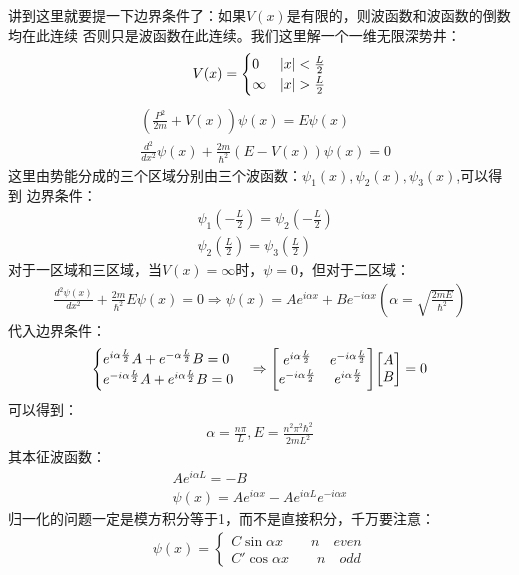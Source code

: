\documentclass[UTF8]{article}
\numberwithin{equation}{section}
\begin{document}
讲到这里就要提一下边界条件了：如果$V(x)$是有限的，则波函数和波函数的倒数均在此连续
否则只是波函数在此连续。我们这里解一个一维无限深势井：
\begin{align*}
    V(x)=\begin{cases}
             0      & \abs{x}<\frac{L}{2} \\
             \infty & \abs{x}>\frac{L}{2}
         \end{cases}
\end{align*}
\begin{align*}
     & (\frac{P^2}{2m}+V(x))\psi(x)=E\psi(x)                       \\
     & \frac{d^2}{dx^2}\psi(x)+\frac{2m}{\hbar^2}(E-V(x))\psi(x)=0
\end{align*}
这里由势能分成的三个区域分别由三个波函数：$\psi_1(x),\psi_2(x),\psi_3(x)$,可以得到
边界条件：
\begin{align*}
     & \psi_1(-\frac{L}{2})=\psi_2(-\frac{L}{2}) \\
     & \psi_2(\frac{L}{2})=\psi_3(\frac{L}{2})
\end{align*}
对于一区域和三区域，当$V(x)=\infty$时，$\psi = 0$，但对于二区域：
\begin{align*}
    \frac{d^2\psi(x)}{dx^2}+\frac{2m}{\hbar^2}E\psi(x)=0\Rightarrow \psi(x)=
    Ae^{i\alpha x}+Be^{-i\alpha x}(\alpha = \sqrt{\frac{2mE}{\hbar^2}})
\end{align*}
代入边界条件：
\begin{align*}
    \begin{cases}
        e^{i\alpha \frac{L}{2}}A+e^{-\alpha\frac{L}{2}}B=0 \\
        e^{-i\alpha \frac{L}{2}}A+e^{i\alpha \frac{L}{2}}B=0
    \end{cases}
    \Rightarrow
    \mqty[e^{i\alpha\frac{L}{2}} & e^{-i\alpha \frac{L}{2}}       \\
    e^{-i\alpha\frac{L}{2}}      & e^{i\alpha\frac{L}{2}}]\mqty[A \\B]=0
\end{align*}
可以得到：
\begin{align*}
    \alpha =\frac{n\pi}{L},E=\frac{n^2\pi^2\hbar^2}{2mL^2}
\end{align*}
其本征波函数：
\begin{align*}
    Ae^{i\alpha L}=-B \\
    \psi(x)=Ae^{i\alpha x}-Ae^{i\alpha L}e^{-i\alpha x}
\end{align*}
归一化的问题一定是模方积分等于1，而不是直接积分，千万要注意：
\begin{align*}
    \psi(x)=\begin{cases}
                C\sin \alpha x \qquad n\quad even \\
                C'\cos \alpha x \qquad n \quad odd
            \end{cases}
\end{align*}
\end{document}
